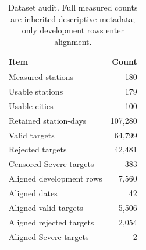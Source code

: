 \begin{table}[t]\centering\caption{Dataset audit. Full measured counts are inherited descriptive metadata; only development rows enter alignment.}
\begin{tabular}{lr}\toprule Item & Count\\\midrule
Measured stations & 180\\
Usable stations & 179\\
Usable cities & 100\\
Retained station-days & 107,280\\
Valid targets & 64,799\\
Rejected targets & 42,481\\
Censored Severe targets & 383\\
\midrule
Aligned development rows & 7,560\\
Aligned dates & 42\\
Aligned valid targets & 5,506\\
Aligned rejected targets & 2,054\\
Aligned Severe targets & 2\\
\bottomrule\end{tabular}\end{table}
